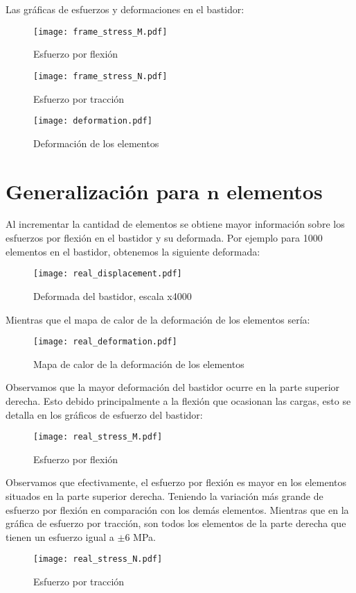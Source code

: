 \documentclass[10pt,a4paper]{article}
\begin{document}
Las gráficas de esfuerzos y deformaciones en el bastidor:
\begin{figure}[H]
    \centering
    \texttt{[image: frame\_stress\_M.pdf]}
    \caption{Esfuerzo por flexión}
\end{figure}
\begin{figure}[H]
    \centering
    \texttt{[image: frame\_stress\_N.pdf]}
    \caption{Esfuerzo por tracción}
\end{figure}

\begin{figure}[H]
    \centering
    \texttt{[image: deformation.pdf]}
    \caption{Deformación de los elementos}
\end{figure}

\section{Generalización para $\mathbf{n}$ elementos}
Al incrementar la cantidad de elementos se obtiene mayor información sobre los esfuerzos por flexión en el bastidor y su deformada. Por ejemplo para 1000 elementos en el bastidor, obtenemos la siguiente deformada:
\begin{figure}[H]
    \centering
    \texttt{[image: real\_displacement.pdf]}
    \caption{Deformada del bastidor, escala x4000}
\end{figure}
Mientras que el mapa de calor de la deformación de los elementos sería:
\begin{figure}[H]
    \centering
    \texttt{[image: real\_deformation.pdf]}
    \caption{Mapa de calor de la deformación de los elementos}
\end{figure}
Observamos que la mayor deformación del bastidor ocurre en la parte superior derecha. Esto debido principalmente a la flexión que ocasionan las cargas, esto se detalla en los gráficos de esfuerzo del bastidor:
\begin{figure}[H]
    \centering
    \texttt{[image: real\_stress\_M.pdf]}
    \caption{Esfuerzo por flexión}
\end{figure}
Observamos que efectivamente, el esfuerzo por flexión es mayor en los elementos situados en la parte superior derecha. Teniendo la variación más grande de esfuerzo por flexión en comparación con los demás elementos. Mientras que en la gráfica de esfuerzo por tracción, son todos los elementos de la parte derecha que tienen un esfuerzo igual a $\pm 6$ MPa.
\begin{figure}[H]
    \centering
    \texttt{[image: real\_stress\_N.pdf]}
    \caption{Esfuerzo por tracción}
\end{figure}
\newpage
\end{document}
